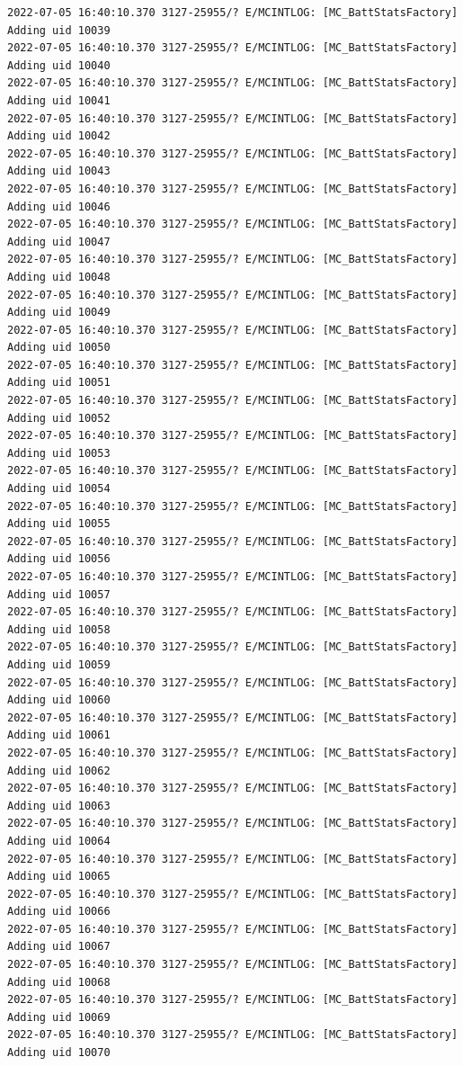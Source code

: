 \documentclass[a4paper,12pt]{book}
\begin{document}
\begin{lstlisting}
2022-07-05 16:40:10.370 3127-25955/? E/MCINTLOG: [MC_BattStatsFactory] Adding uid 10039
2022-07-05 16:40:10.370 3127-25955/? E/MCINTLOG: [MC_BattStatsFactory] Adding uid 10040
2022-07-05 16:40:10.370 3127-25955/? E/MCINTLOG: [MC_BattStatsFactory] Adding uid 10041
2022-07-05 16:40:10.370 3127-25955/? E/MCINTLOG: [MC_BattStatsFactory] Adding uid 10042
2022-07-05 16:40:10.370 3127-25955/? E/MCINTLOG: [MC_BattStatsFactory] Adding uid 10043
2022-07-05 16:40:10.370 3127-25955/? E/MCINTLOG: [MC_BattStatsFactory] Adding uid 10046
2022-07-05 16:40:10.370 3127-25955/? E/MCINTLOG: [MC_BattStatsFactory] Adding uid 10047
2022-07-05 16:40:10.370 3127-25955/? E/MCINTLOG: [MC_BattStatsFactory] Adding uid 10048
2022-07-05 16:40:10.370 3127-25955/? E/MCINTLOG: [MC_BattStatsFactory] Adding uid 10049
2022-07-05 16:40:10.370 3127-25955/? E/MCINTLOG: [MC_BattStatsFactory] Adding uid 10050
2022-07-05 16:40:10.370 3127-25955/? E/MCINTLOG: [MC_BattStatsFactory] Adding uid 10051
2022-07-05 16:40:10.370 3127-25955/? E/MCINTLOG: [MC_BattStatsFactory] Adding uid 10052
2022-07-05 16:40:10.370 3127-25955/? E/MCINTLOG: [MC_BattStatsFactory] Adding uid 10053
2022-07-05 16:40:10.370 3127-25955/? E/MCINTLOG: [MC_BattStatsFactory] Adding uid 10054
2022-07-05 16:40:10.370 3127-25955/? E/MCINTLOG: [MC_BattStatsFactory] Adding uid 10055
2022-07-05 16:40:10.370 3127-25955/? E/MCINTLOG: [MC_BattStatsFactory] Adding uid 10056
2022-07-05 16:40:10.370 3127-25955/? E/MCINTLOG: [MC_BattStatsFactory] Adding uid 10057
2022-07-05 16:40:10.370 3127-25955/? E/MCINTLOG: [MC_BattStatsFactory] Adding uid 10058
2022-07-05 16:40:10.370 3127-25955/? E/MCINTLOG: [MC_BattStatsFactory] Adding uid 10059
2022-07-05 16:40:10.370 3127-25955/? E/MCINTLOG: [MC_BattStatsFactory] Adding uid 10060
2022-07-05 16:40:10.370 3127-25955/? E/MCINTLOG: [MC_BattStatsFactory] Adding uid 10061
2022-07-05 16:40:10.370 3127-25955/? E/MCINTLOG: [MC_BattStatsFactory] Adding uid 10062
2022-07-05 16:40:10.370 3127-25955/? E/MCINTLOG: [MC_BattStatsFactory] Adding uid 10063
2022-07-05 16:40:10.370 3127-25955/? E/MCINTLOG: [MC_BattStatsFactory] Adding uid 10064
2022-07-05 16:40:10.370 3127-25955/? E/MCINTLOG: [MC_BattStatsFactory] Adding uid 10065
2022-07-05 16:40:10.370 3127-25955/? E/MCINTLOG: [MC_BattStatsFactory] Adding uid 10066
2022-07-05 16:40:10.370 3127-25955/? E/MCINTLOG: [MC_BattStatsFactory] Adding uid 10067
2022-07-05 16:40:10.370 3127-25955/? E/MCINTLOG: [MC_BattStatsFactory] Adding uid 10068
2022-07-05 16:40:10.370 3127-25955/? E/MCINTLOG: [MC_BattStatsFactory] Adding uid 10069
2022-07-05 16:40:10.370 3127-25955/? E/MCINTLOG: [MC_BattStatsFactory] Adding uid 10070

\end{lstlisting}
\end{document}
